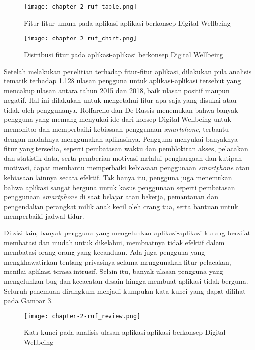 \begin{figure}[h]
  \centering
  \texttt{[image: chapter-2-ruf\_table.png]}
  \caption{Fitur-fitur umum pada aplikasi-aplikasi berkonsep Digital Wellbeing \parencite{CHI2019SOCIALIZE}}
  \label{img:ruf_table}
\end{figure}

\begin{figure}[h]
  \centering
  \texttt{[image: chapter-2-ruf\_chart.png]}
  \caption{Distribusi fitur pada aplikasi-aplikasi berkonsep Digital Wellbeing \parencite{CHI2019SOCIALIZE}}
  \label{img:ruf_chart}
\end{figure}

Setelah melakukan penelitian terhadap fitur-fitur aplikasi, dilakukan pula analisis tematik terhadap 1.128 ulasan pengguna untuk aplikasi-aplikasi tersebut yang mencakup ulasan antara tahun 2015 dan 2018, baik ulasan positif maupun negatif. Hal ini dilakukan untuk mengetahui fitur apa saja yang disukai atau tidak oleh penggunanya. Roffarello dan De Russis menemukan bahwa banyak pengguna yang memang menyukai ide dari konsep Digital Wellbeing untuk memonitor dan memperbaiki kebiasaan penggunaan \textit{smartphone}, terbantu dengan mudahnya menggunakan aplikasinya. Pengguna menyukai banyaknya fitur yang tersedia, seperti pembatasan waktu dan pemblokiran akses, pelacakan dan statistik data, serta pemberian motivasi melalui penghargaan dan kutipan motivasi, dapat membantu memperbaiki kebiasaan penggunaan \textit{smartphone} atau kebiasaan lainnya secara efektif. Tak hanya itu, pengguna juga menemukan bahwa aplikasi sangat berguna untuk kasus penggunaan seperti pembatasan penggunaan \textit{smartphone} di saat belajar atau bekerja, pemantauan dan pengendalian perangkat milik anak kecil oleh orang tua, serta bantuan untuk memperbaiki jadwal tidur.

Di sisi lain, banyak pengguna yang mengeluhkan aplikasi-aplikasi kurang bersifat membatasi dan mudah untuk dikelabui, membuatnya tidak efektif dalam membatasi orang-orang yang kecanduan. Ada juga pengguna yang mengkhawatirkan tentang privasinya selama menggunakan fitur pelacakan, menilai aplikasi terasa intrusif. Selain itu, banyak ulasan pengguna yang mengeluhkan bug dan kecacatan desain hingga membuat aplikasi tidak berguna. Seluruh penemuan dirangkum menjadi kumpulan kata kunci yang dapat dilihat pada Gambar \ref{img:ruf_review}.

\begin{figure}[h]
  \centering
  \texttt{[image: chapter-2-ruf\_review.png]}
  \caption{Kata kunci pada analisis ulasan aplikasi-aplikasi berkonsep Digital Wellbeing \parencite{CHI2019SOCIALIZE}}
  \label{img:ruf_review}
\end{figure}

